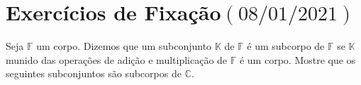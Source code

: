\chapter{Exercícios de Fixação\quad$\left(08/01/2021\right)$}

\begin{questions}
  \question\label{exercício:1.1}

  Seja $\mathbb{F}$ um corpo.
  Dizemos que um subconjunto $\mathbb{K}$ de $\mathbb{F}$ é um
  subcorpo de $\mathbb{F}$ se $\mathbb{K}$ munido das operações de
  adição e multiplicação de $\mathbb{F}$ é um corpo.
  Mostre que os seguintes subconjuntos são subcorpos de $\mathbb{C}$.

  \begin{parts}
  \end{parts}

  \begin{solutionordottedlines}
    \begin{parts}

\end{parts}
\end{solutionordottedlines}
\end{questions}
